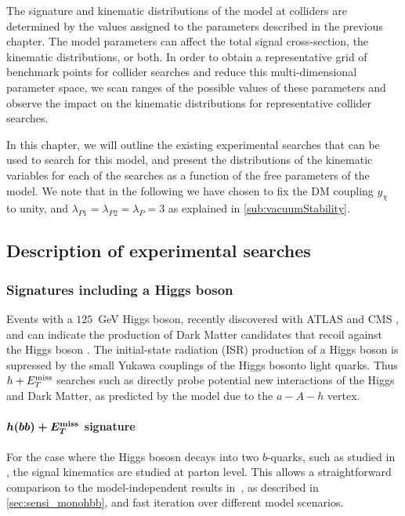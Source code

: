 The signature and kinematic distributions of the \hdma model at colliders are determined by the values assigned to the parameters described in the previous chapter. 
The model parameters can affect the total signal cross-section, the kinematic distributions, or both. 
In order to obtain a representative grid of benchmark points for collider searches and reduce this multi-dimensional parameter space, we scan ranges of the possible values of these parameters and observe the impact on the kinematic distributions for representative collider searches.


In this chapter, we will outline the existing experimental searches that can be used to search for this model, and present the distributions of the kinematic variables for each of the searches as a function of the free parameters of the model. 
We note that in the following we have chosen to fix the DM coupling  $y_\chi$ to unity, and $\lambda_{P1} = \lambda_{P2} = \lambda_P = 3$ as explained in \autoref{sub:vacuumStability}.  

\subsection{Description of experimental searches}

\subsubsection{Signatures including a Higgs boson}
Events with a  $125$~GeV Higgs boson, recently discovered with ATLAS and CMS \cite{Aad:2012tfa,Chatrchyan:2012xdj}, and \MET can indicate 
the production of Dark Matter candidates that recoil against the Higgs boson \cite{Carpenter:2013xra,Petrov:2013nia}. 
The initial-state radiation (ISR) production of a Higgs boson is supressed by the small Yukawa couplings of the Higgs bosonto light quarks. Thus $h+E_T^\mathrm{miss}$ searches such as \cite{Aaboud:2017yqz,Aaboud:2017uak} 
directly probe potential new interactions of the Higgs and Dark Matter, as predicted by the \hdma model \cite{Bauer:2017ota,No:2015xqa} due to the $a-A-h$ vertex. 

 
\paragraph{$\boldsymbol{h(bb)+E_T^\mathrm{miss}}$ signature} For the case where the Higgs bososn decays into two $b$-quarks, such as studied in \cite{Aaboud:2017yqz}, the signal kinematics are studied at parton level. 
This allows a straightforward comparison to the model-independent results in~\cite{Aaboud:2017yqz}, as described in \autoref{sec:sensi_monohbb}, and fast iteration over different model scenarios. 

